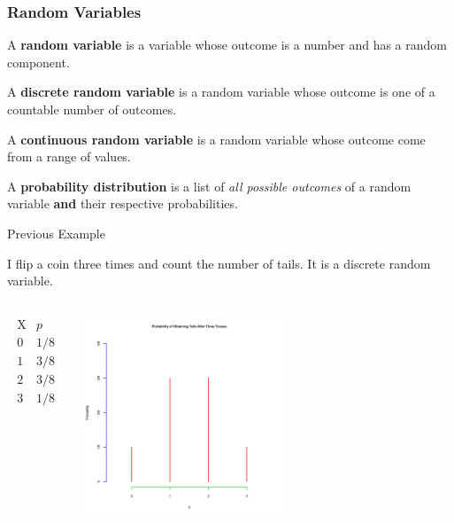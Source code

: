 \begin{frame}
  \frametitle{Random Variables}

  \begin{definition}
    A \textbf{random variable} is a variable whose outcome is a number
    and has a random component.
  \end{definition}

  {
    \begin{definition}
      A \textbf{discrete random variable} is a random variable whose
      outcome is one of a countable number of outcomes.
    \end{definition}
  }

  {
    \begin{definition}
      A \textbf{continuous random variable} is a random variable whose
      outcome come from a range of values.
    \end{definition}
  }

  {
    \begin{definition}
      A \textbf{probability distribution} is a list of \textit{all
        possible outcomes} of a random variable \textbf{and} their
      respective probabilities.
    \end{definition}
  }

\end{frame}

\begin{frame}{Previous Example}

  I flip a coin three times and count the number of tails. It is a
  discrete random variable.

  \begin{columns}

    \begin{eqnarray*}
      \begin{array}{l|l}
        \mathrm{X} & p \\ \hline
        0  & 1/8 \\
        1  & 3/8 \\
        2  & 3/8 \\
        3  & 1/8
      \end{array}
    \end{eqnarray*}


    \includegraphics[width=6cm]{img/probDist3Tosses}

  \end{columns}
  
  
\end{frame}


